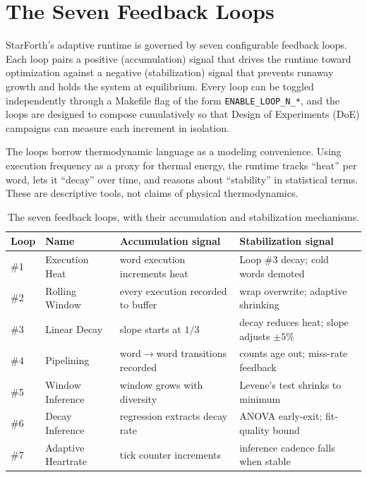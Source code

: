 
\section{The Seven Feedback Loops}

StarForth's adaptive runtime is governed by seven configurable feedback loops.
Each loop pairs a positive (accumulation) signal that drives the runtime toward
optimization against a negative (stabilization) signal that prevents runaway
growth and holds the system at equilibrium. Every loop can be toggled
independently through a Makefile flag of the form \texttt{ENABLE\_LOOP\_N\_*},
and the loops are designed to compose cumulatively so that Design of Experiments
(DoE) campaigns can measure each increment in isolation.

The loops borrow thermodynamic language as a modeling convenience. Using
execution frequency as a proxy for thermal energy, the runtime tracks
``heat'' per word, lets it ``decay'' over time, and reasons about ``stability''
in statistical terms. These are descriptive tools, not claims of physical
thermodynamics.

\begin{table}[ht]
\centering
\small
\begin{tabular}{llll}
\toprule
Loop & Name & Accumulation signal & Stabilization signal \\
\midrule
\#1 & Execution Heat & word execution increments heat & Loop \#3 decay; cold words demoted \\
\#2 & Rolling Window & every execution recorded to buffer & wrap overwrite; adaptive shrinking \\
\#3 & Linear Decay & slope starts at $1/3$ & decay reduces heat; slope adjusts $\pm 5\%$ \\
\#4 & Pipelining & word$\rightarrow$word transitions recorded & counts age out; miss-rate feedback \\
\#5 & Window Inference & window grows with diversity & Levene's test shrinks to minimum \\
\#6 & Decay Inference & regression extracts decay rate & ANOVA early-exit; fit-quality bound \\
\#7 & Adaptive Heartrate & tick counter increments & inference cadence falls when stable \\
\bottomrule
\end{tabular}
\caption{The seven feedback loops, with their accumulation and stabilization mechanisms.}
\end{table}

